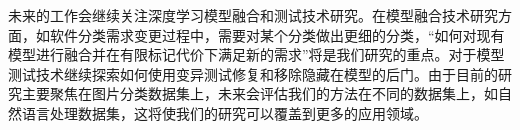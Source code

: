 \documentclass[fontset=macnew,UTF8]{article} %
\begin{document}
未来的工作会继续关注深度学习模型融合和测试技术研究。在模型融合技术研究方面，如软件分类需求变更过程中，需要对某个分类做出更细的分类，“如何对现有模型进行融合并在有限标记代价下满足新的需求”将是我们研究的重点。对于模型测试技术继续探索如何使用变异测试修复和移除隐藏在模型的后门。由于目前的研究主要聚焦在图片分类数据集上，未来会评估我们的方法在不同的数据集上，如自然语言处理数据集，这将使我们的研究可以覆盖到更多的应用领域。

\end{document}
